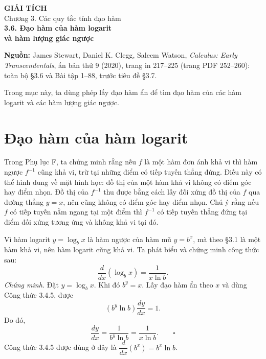 \documentclass[12pt,a4paper]{article}
\begin{document}
\begin{center}
{\Large\bfseries GIẢI TÍCH}\\[5pt]
{\large Chương 3. Các quy tắc tính đạo hàm}\\[9pt]
{\Large\bfseries 3.6. Đạo hàm của hàm logarit\\[3pt]và hàm lượng giác ngược}
\end{center}
\noindent\textbf{Nguồn:} James Stewart, Daniel K. Clegg, Saleem Watson, \textit{Calculus: Early Transcendentals}, ấn bản thứ 9 (2020), trang in 217–225 (trang PDF 252–260): toàn bộ §3.6 và Bài tập 1–88, trước tiêu đề §3.7.

Trong mục này, ta dùng phép lấy đạo hàm ẩn để tìm đạo hàm của các hàm logarit và các hàm lượng giác ngược.
\section*{Đạo hàm của hàm logarit}
Trong Phụ lục F, ta chứng minh rằng nếu $f$ là một hàm đơn ánh khả vi thì hàm ngược $f^{-1}$ cũng khả vi, trừ tại những điểm có tiếp tuyến thẳng đứng. Điều này có thể hình dung về mặt hình học: đồ thị của một hàm khả vi không có điểm góc hay điểm nhọn. Đồ thị của $f^{-1}$ thu được bằng cách lấy đối xứng đồ thị của $f$ qua đường thẳng $y=x$, nên cũng không có điểm góc hay điểm nhọn. Chú ý rằng nếu $f$ có tiếp tuyến nằm ngang tại một điểm thì $f^{-1}$ có tiếp tuyến thẳng đứng tại điểm đối xứng tương ứng và không khả vi tại đó.

Vì hàm logarit $y=\log_bx$ là hàm ngược của hàm mũ $y=b^x$, mà theo §3.1 là một hàm khả vi, nên hàm logarit cũng khả vi. Ta phát biểu và chứng minh công thức sau:
\[\frac{d}{dx}(\log_bx)=\frac1{x\ln b}.\tag{1}\]
\noindent\textit{Chứng minh.} Đặt $y=\log_bx$. Khi đó $b^y=x$. Lấy đạo hàm ẩn theo $x$ và dùng Công thức 3.4.5, được
\[(b^y\ln b)\frac{dy}{dx}=1.\]
Do đó,
\[\frac{dy}{dx}=\frac1{b^y\ln b}=\frac1{x\ln b}.\qquad\square\]
Công thức 3.4.5 được dùng ở đây là $\dfrac{d}{dx}(b^x)=b^x\ln b$.
\end{document}
